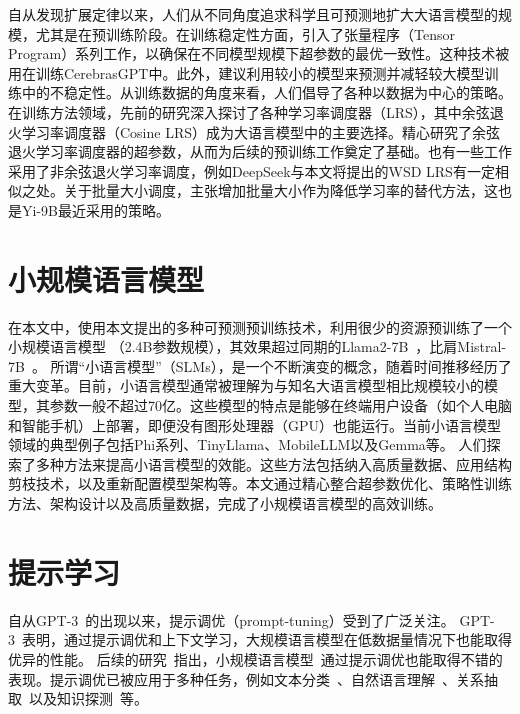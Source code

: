 自从发现扩展定律\citep{hestness2017deep, kaplan2020scaling, rae2021scaling, aghajanyan2023scaling}以来，人们从不同角度追求科学且可预测地\citep{achiam2023gpt,hu2023unlock, du2024understanding}扩大大语言模型的规模，尤其是在预训练阶段。在训练稳定性方面，引入了张量程序（Tensor Program）系列工作\citep{yang2022tensor, yang2023tensor}，以确保在不同模型规模下超参数的最优一致性。这种技术被用在训练CerebrasGPT\citep{dey2023cerebras}中。此外，\citet{wortsman2023small}建议利用较小的模型来预测并减轻较大模型训练中的不稳定性。从训练数据的角度来看，人们倡导了各种以数据为中心的策略\citep{xie2024doremi, shi2023context, ye2024data}。在训练方法领域，先前的研究深入探讨了各种学习率调度器（LRS）\citep{howard2018universal, raffel2020exploring, hundt2019sharpdarts}，其中余弦退火学习率调度器（Cosine LRS）\citep{loshchilov2016sgdr}成为大语言模型中的主要选择。\citet{kaplan2020scaling,hoffmann2022training}精心研究了余弦退火学习率调度器的超参数，从而为后续的预训练工作奠定了基础。也有一些工作采用了非余弦退火学习率调度，例如DeepSeek\citep{bi2024deepseek}与本文将提出的WSD LRS有一定相似之处。关于批量大小调度，\cite{smith2017don}主张增加批量大小作为降低学习率的替代方法，这也是Yi-9B\citep{young2024yi}最近采用的策略。

\section{小规模语言模型}

在本文中，使用本文提出的多种可预测预训练技术，利用很少的资源预训练了一个小规模语言模型 （2.4B参数规模），其效果超过同期的Llama2-7B~\cite{touvron2023llama2}，比肩Mistral-7B~\cite{jiang2023mistral}。
所谓“小语言模型”（SLMs），是一个不断演变的概念，随着时间推移经历了重大变革。目前，小语言模型通常被理解为与知名大语言模型相比规模较小的模型，其参数一般不超过70亿。这些模型的特点是能够在终端用户设备（如个人电脑和智能手机）上部署，即便没有图形处理器（GPU）也能运行。当前小语言模型领域的典型例子包括Phi系列\citep{gunasekar2023textbooks, li2023textbooks, Javaheripi2023Phi2}、TinyLlama\citep{zhang2024tinyllama}、MobileLLM\citep{liu2024mobilellm}以及Gemma\citep{Banks2024Gemma}等。 人们探索了多种方法来提高小语言模型的效能。这些方法包括纳入高质量数据\citep{gunasekar2023textbooks, li2023textbooks, Javaheripi2023Phi2}、应用结构剪枝技术\citep{xia2023sheared}，以及重新配置模型架构\citep{liu2024mobilellm}等。本文通过精心整合超参数优化、策略性训练方法、架构设计以及高质量数据，完成了小规模语言模型的高效训练。


\section{提示学习}
自从GPT-3~\cite{brown2020language}的出现以来，提示调优（prompt-tuning）受到了广泛关注。  
GPT-3~\cite{brown2020language}表明，通过提示调优和上下文学习，大规模语言模型在低数据量情况下也能取得优异的性能。  
后续的研究~\cite{schick2020exploiting, schick2020s}指出，小规模语言模型~\cite{radford2018improving, devlin2019bert, liu2019roberta, lan2019albert}通过提示调优也能取得不错的表现。提示调优已被应用于多种任务，例如文本分类~\cite{schick2020exploiting}、自然语言理解~\cite{schick2020s, liu2021gpt}、关系抽取~\cite{han2021ptr,chen2021adaprompt}以及知识探测~\cite{petroni2019language, liu2021gpt}等。

